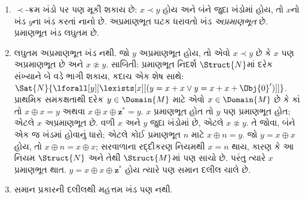 \documentclass[../../../include/open-logic-section]{subfiles}
\begin{document}
\begin{enumerate}
  થાય; તેથી $x^* \prec
  y$. એ જ રીતે,
  જો $x \prec y$
  અને $x \not\approx y$
  હોય, તો $x \prec
  {^*y}$. તેથી
  $x \prec y$ અને
  $x \not\approx y$
  હોય તો દરેક
  $w \approx x$ એ
  દરેક $v \approx y$
  કરતાં $\prec$-નાનો છે.
  તદનુસાર, દરેક
  અપ્રમાણભૂત ખંડ~$[x]$
  નીચે જેવી બંને
  દિશાએ અનંત સાંકળ
  બનાવે છે:
  \[
  \cdots \prec  {^{**}x} \prec {^*}x \prec x \prec x^* \prec x^{**}
  \prec \cdots
  \]
  પૂર્ણાંકો જેવો ક્રમપ્રકાર
  હોવાથી તેને $Z$-સાંકળ
  કહે છે.
\item $\prec$-ક્રમ ખંડો
  પર પણ મૂકી શકાય છે:
  $x \prec y$ હોય અને
  બંને જુદા ખંડોમાં
  હોય, તો $x$નો
  ખંડ $y$ના ખંડ
  કરતાં નાનો છે.
  અપ્રમાણભૂત ઘટક
  ધરાવતો ખંડ
  \emph{અપ્રમાણભૂત}
  છે. પ્રમાણભૂત
  ખંડ લઘુતમ છે.
\item લઘુતમ અપ્રમાણભૂત
  ખંડ નથી. જો $y$
  અપ્રમાણભૂત હોય,
  તો એવો $x \prec y$
  છે કે $x$ પણ
  અપ્રમાણભૂત છે અને
  $x \not\approx y$.
  સાબિતી: પ્રમાણભૂત
  નિદર્શ $\Struct{N}$માં
  દરેક સંખ્યાને
  બે વડે ભાગી શકાય,
  કદાચ એક શેષ સાથે:
  $\Sat{N}{\lforall[y][\lexists[x][(y = x + x \lor y = x + x +
        \Obj{0}')]]}$.
  પ્રાથમિક સમકક્ષતાથી
  દરેક $y \in
  \Domain{M}$ માટે
  એવો $x \in
  \Domain{M}$ છે કે
  કાં તો $x \oplus x
  = y$ અથવા
  $x \oplus x \oplus
  \mathbf{z}^*= y$.
  $x$ પ્રમાણભૂત
  હોત તો $y$
  પણ પ્રમાણભૂત
  હોત; એટલે
  $x$ અપ્રમાણભૂત છે.
  વળી $x$ અને
  $y$ જુદા ખંડોમાં
  છે, એટલે
  $x \not\approx y$.
  તે જોવા, બંને
  એક જ ખંડમાં
  હોવાનું ધારો;
  એટલે કોઈ
  પ્રમાણભૂત $n$
  માટે $x \oplus n =
  y$. જો $y = x
  \oplus x$ હોય,
  તો $x \oplus n =
  x \oplus x$;
  સરવાળાના રદ્દીકરણ
  નિયમથી $x = n$
  થાય, કારણ કે
  આ નિયમ $\Struct{N}$
  અને તેથી
  $\Struct{M}$માં
  પણ સાચો છે.
  પરંતુ ત્યારે
  $x$ પ્રમાણભૂત
  થાત. $y = x
  \oplus x \oplus
  \mathbf{z}^*$ હોય
  ત્યારે પણ
  સમાન દલીલ ચાલે છે.
\item સમાન પ્રકારની
  દલીલથી મહત્તમ
  ખંડ પણ નથી.

\end{enumerate}
\end{document}
